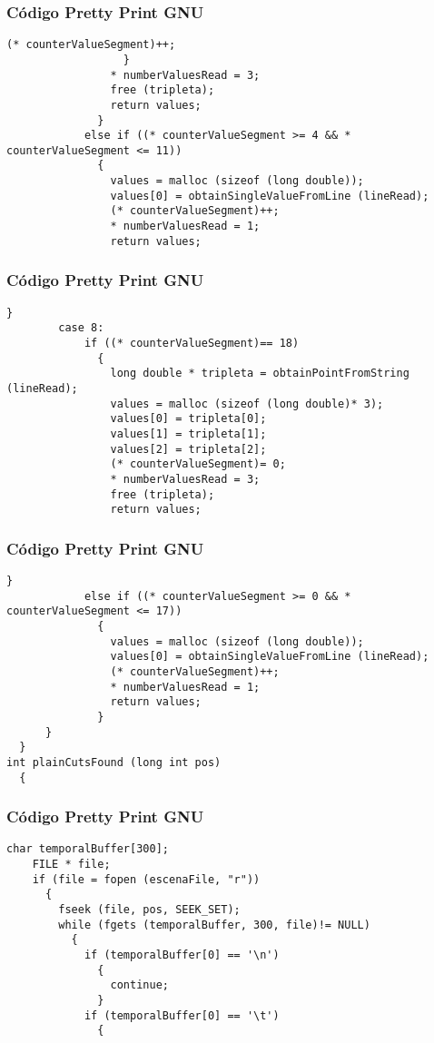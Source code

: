 \documentclass{beamer}
\begin{document}
\begin{frame}[fragile]
\frametitle{C\'odigo Pretty Print GNU}
\begin{lstlisting}[style=CStyle]
                     (* counterValueSegment)++;
                  }
                * numberValuesRead = 3;
                free (tripleta);
                return values;
              }
            else if ((* counterValueSegment >= 4 && * counterValueSegment <= 11))
              {
                values = malloc (sizeof (long double));
                values[0] = obtainSingleValueFromLine (lineRead);
                (* counterValueSegment)++;
                * numberValuesRead = 1;
                return values;
\end{lstlisting}
\end{frame}
\begin{frame}[fragile]
\frametitle{C\'odigo Pretty Print GNU}
\begin{lstlisting}[style=CStyle]
              }
        case 8:
            if ((* counterValueSegment)== 18)
              {
                long double * tripleta = obtainPointFromString (lineRead);
                values = malloc (sizeof (long double)* 3);
                values[0] = tripleta[0];
                values[1] = tripleta[1];
                values[2] = tripleta[2];
                (* counterValueSegment)= 0;
                * numberValuesRead = 3;
                free (tripleta);
                return values;
\end{lstlisting}
\end{frame}
\begin{frame}[fragile]
\frametitle{C\'odigo Pretty Print GNU}
\begin{lstlisting}[style=CStyle]
              }
            else if ((* counterValueSegment >= 0 && * counterValueSegment <= 17))
              {
                values = malloc (sizeof (long double));
                values[0] = obtainSingleValueFromLine (lineRead);
                (* counterValueSegment)++;
                * numberValuesRead = 1;
                return values;
              }
      }
  }
int plainCutsFound (long int pos)
  {
    \end{lstlisting}
\end{frame}
\begin{frame}[fragile]
\frametitle{C\'odigo Pretty Print GNU}
\begin{lstlisting}[style=CStyle]
    char temporalBuffer[300];
    FILE * file;
    if (file = fopen (escenaFile, "r"))
      {
        fseek (file, pos, SEEK_SET);
        while (fgets (temporalBuffer, 300, file)!= NULL)
          {
            if (temporalBuffer[0] == '\n')
              {
                continue;
              }
            if (temporalBuffer[0] == '\t')
              {
                \end{lstlisting}
\end{frame}
\end{document}
